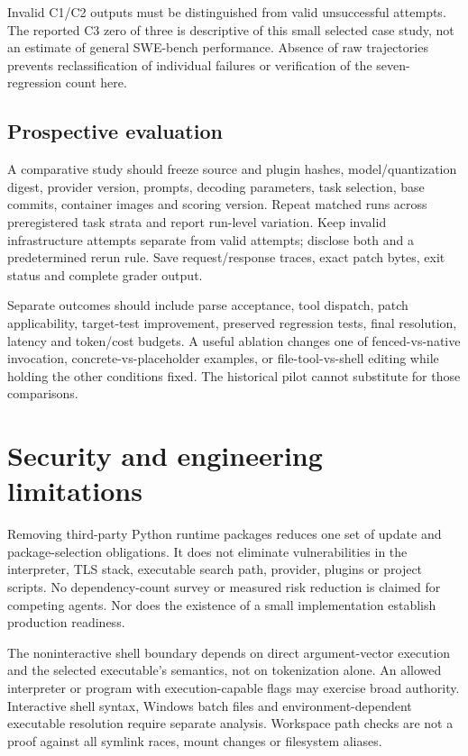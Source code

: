 \documentclass[10pt,twocolumn,letterpaper]{article}
\begin{document}
Invalid C1/C2 outputs must be distinguished from valid unsuccessful attempts. The reported C3 zero of three is descriptive of this small selected case study, not an estimate of general SWE-bench performance. Absence of raw trajectories prevents reclassification of individual failures or verification of the seven-regression count here.

\subsection{Prospective evaluation}
A comparative study should freeze source and plugin hashes, model/quantization digest, provider version, prompts, decoding parameters, task selection, base commits, container images and scoring version. Repeat matched runs across preregistered task strata and report run-level variation. Keep invalid infrastructure attempts separate from valid attempts; disclose both and a predetermined rerun rule. Save request/response traces, exact patch bytes, exit status and complete grader output.

Separate outcomes should include parse acceptance, tool dispatch, patch applicability, target-test improvement, preserved regression tests, final resolution, latency and token/cost budgets. A useful ablation changes one of fenced-vs-native invocation, concrete-vs-placeholder examples, or file-tool-vs-shell editing while holding the other conditions fixed. The historical pilot cannot substitute for those comparisons.

\section{Security and engineering limitations}
Removing third-party Python runtime packages reduces one set of update and package-selection obligations. It does not eliminate vulnerabilities in the interpreter, TLS stack, executable search path, provider, plugins or project scripts. No dependency-count survey or measured risk reduction is claimed for competing agents. Nor does the existence of a small implementation establish production readiness.

The noninteractive shell boundary depends on direct argument-vector execution and the selected executable's semantics, not on tokenization alone. An allowed interpreter or program with execution-capable flags may exercise broad authority. Interactive shell syntax, Windows batch files and environment-dependent executable resolution require separate analysis. Workspace path checks are not a proof against all symlink races, mount changes or filesystem aliases.
\end{document}
